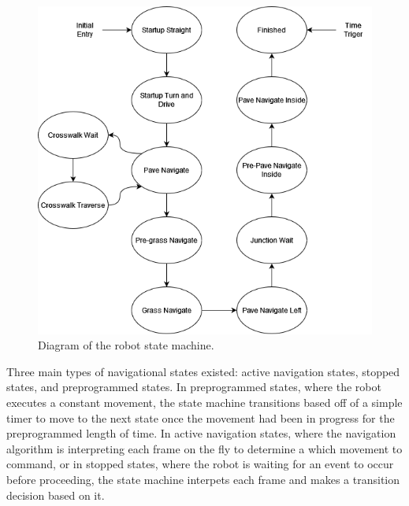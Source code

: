 \documentclass[titlepage, twocolumn]{article}
\begin{document}
        \begin{figure}
            \includegraphics[width=\linewidth]{statemachine.png}
            \caption{Diagram of the robot state machine.}
            \label{fig:statemachine}
        \end{figure}

        Three main types of navigational states existed: active navigation states, stopped states, and preprogrammed states. In preprogrammed states, where the robot executes a constant movement, the state machine transitions based off of a simple timer to move to the next state once the movement had been in progress for the preprogrammed length of time. In active navigation states, where the navigation algorithm is interpreting each frame on the fly to determine a which movement to command, or in stopped states, where the robot is waiting for an event to occur before proceeding, the state machine interpets each frame and makes a transition decision based on it.
\end{document}
